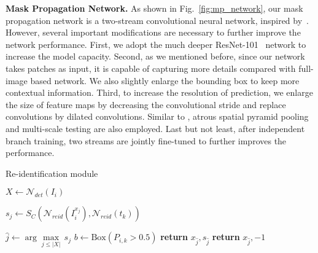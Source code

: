 %
\noindent
\textbf{Mask Propagation Network.} 
%
As shown in Fig.~\ref{fig:mp_network}, our mask propagation network is a two-stream convolutional neural network, inspired by~\cite{khoreva_lucid_dreams17}. 
%
However, several important modifications are necessary to further improve the network performance.
%
First, we adopt the much deeper ResNet-101~\cite{He2015} network to increase the model capacity.
%
Second, as we mentioned before, since our network takes patches as input, it is capable of capturing more details compared with full-image based network.
%
We also slightly enlarge the bounding box to keep more contextual information.
% 
Third, to increase the resolution of prediction, we enlarge the size of feature maps by decreasing the convolutional stride and replace convolutions by dilated convolutions.
%
Similar to \cite{chen2014semantic}, atrous spatial pyramid pooling and multi-scale testing are also employed.
%
Last but not least, after independent branch training, two streams are jointly fine-tuned to further improves the performance.


\begin{algorithm} 
	\caption{Re-identification module}   
	\label{alg:reid}
	\begin{algorithmic}[1]
		\small
			\State $X \gets \mathcal{N}_{det}(I_i)$ 
	
				\State $s_j \gets S_C(\mathcal{N}_{reid}(I_i^{x_j}), \mathcal{N}_{reid}(t_k))$ 
			\EndFor
			
			\State $\hat{j} \gets \arg\underset{j \le \left\vert{X}\right\vert }{\max}\, s_j$
			\State $b \gets \mathrm{Box}(P_{i,k} > 0.5)$
				\State \textbf{return} $x_{\hat{j}}, s_{\hat{j}}$
			\Else
				\State \textbf{return} $x_{\hat{j}}, -1$ 
			\EndIf
		\EndProcedure
	\end{algorithmic}  
\end{algorithm} 

